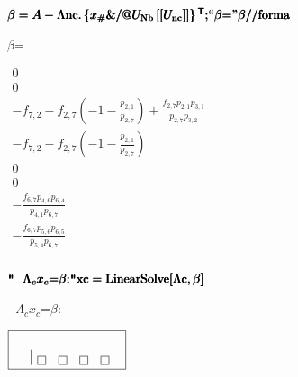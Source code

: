 \documentclass{article}
\newcommand{\unicode}[1]{{}}
\begin{document}
\begin{doublespace}
\noindent\(\pmb{\beta =A-\text{$\Lambda $nc}.\left\{x_{\#}\&\text{/@}U_{\text{Nb}}\left[\left[U_{\text{nc}}\right]\right]\right\}{}^{\mathsf{T}};}\\
\pmb{\text{{``}$\beta $={''}}}\\
\pmb{\beta \text{//}\text{forma}}\)
\end{doublespace}

\begin{doublespace}
\noindent\(\text{$\beta $=}\)
\end{doublespace}

\begin{doublespace}
\noindent\(\begin{array}{l}
 0 \\
 0 \\
 -f_{7,2}-f_{2,7} \left(-1-\frac{p_{2,1}}{p_{2,7}}\right)+\frac{f_{2,7} p_{2,1} p_{3,1}}{p_{2,7} p_{3,2}} \\
 -f_{7,2}-f_{2,7} \left(-1-\frac{p_{2,1}}{p_{2,7}}\right) \\
 0 \\
 0 \\
 -\frac{f_{6,7} p_{4,6} p_{6,4}}{p_{4,1} p_{6,7}} \\
 -\frac{f_{6,7} p_{5,6} p_{6,5}}{p_{5,4} p_{6,7}} \\
\end{array}\)
\end{doublespace}

\begin{doublespace}
\noindent\(\pmb{\text{$\texttt{"}\unicode{0440}\unicode{0435}\unicode{0448}\unicode{0430}\unicode{0435}\unicode{043c}$ $\unicode{0443}\unicode{0440}\unicode{0430}\unicode{0432}\unicode{043d}\unicode{0435}\unicode{043d}\unicode{0438}\unicode{0435}$
}\Lambda _cx_c\text{=$\beta $:$\texttt{"}$}}\\
\pmb{\text{xc}=\text{LinearSolve}[\text{$\Lambda $c},\beta ]}\)
\end{doublespace}

\begin{doublespace}
\noindent\(\text{$\unicode{0440}\unicode{0435}\unicode{0448}\unicode{0430}\unicode{0435}\unicode{043c}$ $\unicode{0443}\unicode{0440}\unicode{0430}\unicode{0432}\unicode{043d}\unicode{0435}\unicode{043d}\unicode{0438}\unicode{0435}$
}\Lambda _cx_c\text{=$\beta $:}\)
\end{doublespace}

\begin{doublespace}
\noindent\(\fbox{$
\begin{array}{l}
  \\
 
\begin{array}{c|cccc}
  & \fbox{$\text{}$} & \fbox{$\text{}$} & \fbox{$\text{}$} & \fbox{$\text{}$} \\
\end{array}
 \\
\end{array}
$}\)
\end{doublespace}
\end{document}
